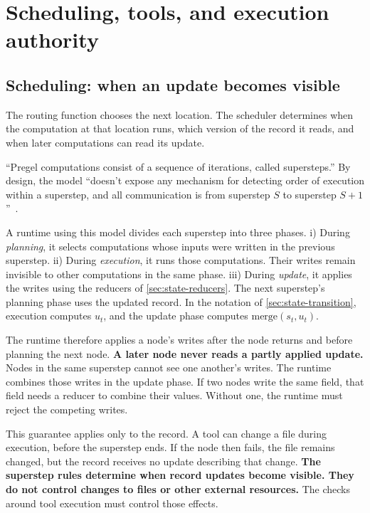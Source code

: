 \section{Scheduling, tools, and execution authority}
\label{sec:boundary}

\subsection{Scheduling: when an update becomes visible}
\label{sec:boundary-scheduling}

The routing function chooses the next location. The scheduler determines when the computation at
that location runs, which version of the record it reads, and when later computations can read
its update.

\begin{definition}[Superstep]
\label{def:superstep}
``Pregel computations consist of a sequence of iterations, called supersteps.'' By design, the model
``doesn't expose any mechanism for detecting order of execution within a superstep, and all
communication is from superstep $S$ to superstep $S + 1$''~\citep[\S1]{malewicz2010pregel}.
\end{definition}

A runtime using this model divides each superstep into three phases. i) During \emph{planning},
it selects computations whose inputs were written in the previous superstep. ii) During
\emph{execution}, it runs those computations. Their writes remain invisible to other computations
in the same phase. iii) During \emph{update}, it applies the writes using the reducers of
\cref{sec:state-reducers}. The next superstep's planning phase uses the updated record. In the
notation of \cref{sec:state-transition}, execution computes $u_t$, and the update phase computes
$\mathrm{merge}(s_t, u_t)$.

The runtime therefore applies a node's writes after the node returns and before planning the
next node. \textbf{A later node never reads a partly applied update.} Nodes in the same superstep
cannot see one another's writes. The runtime combines those writes in the update phase. If two
nodes write the same field, that field needs a reducer to combine their values. Without one, the
runtime must reject the competing writes.

This guarantee applies only to the record. A tool can change a file during execution, before the
superstep ends. If the node then fails, the file remains changed, but the record receives no
update describing that change. \textbf{The superstep rules determine when record updates become
visible. They do not control changes to files or other external resources.} The checks around
tool execution must control those effects.

